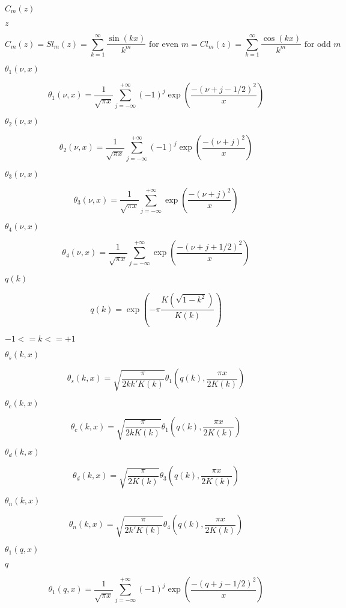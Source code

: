 \documentclass{article}
\begin{document}
$ C_m(z) $
\pagebreak

$ z $
\pagebreak

\[ C_m(z) = Sl_m(z) = \sum_{k=1}^\infty\frac{\sin(kx)}{k^m} \mbox{ for even } m = Cl_m(z) = \sum_{k=1}^\infty\frac{\cos(kx)}{k^m} \mbox{ for odd } m \]
\pagebreak

$ \theta_1(\nu,x) $
\pagebreak

\[ \theta_1(\nu,x) = \frac{1}{\sqrt{\pi x}} \sum_{j=-\infty}^{+\infty} (-1)^j \exp\left( \frac{-(\nu + j - 1/2)^2}{x} \right) \]
\pagebreak

$ \theta_2(\nu,x) $
\pagebreak

\[ \theta_2(\nu,x) = \frac{1}{\sqrt{\pi x}} \sum_{j=-\infty}^{+\infty} (-1)^j \exp\left( \frac{-(\nu + j)^2}{x} \right) \]
\pagebreak

$ \theta_3(\nu,x) $
\pagebreak

\[ \theta_3(\nu,x) = \frac{1}{\sqrt{\pi x}} \sum_{j=-\infty}^{+\infty} \exp\left( \frac{-(\nu+j)^2}{x} \right) \]
\pagebreak

$ \theta_4(\nu,x) $
\pagebreak

\[ \theta_4(\nu,x) = \frac{1}{\sqrt{\pi x}} \sum_{j=-\infty}^{+\infty} \exp\left( \frac{-(\nu + j + 1/2)^2}{x} \right) \]
\pagebreak

$ q(k) $
\pagebreak

\[ q(k) = \exp \left(-\pi\frac{K(\sqrt{1-k^2})}{K(k)} \right) \]
\pagebreak

$ -1 <= k <= +1 $
\pagebreak

$ \theta_s(k,x) $
\pagebreak

\[ \theta_s(k,x) = \sqrt{\frac{\pi}{2 k k' K(k)}} \theta_1\left(q(k),\frac{\pi x}{2K(k)}\right) \]
\pagebreak

$ \theta_c(k,x) $
\pagebreak

\[ \theta_c(k,x) = \sqrt{\frac{\pi}{2 k K(k)}} \theta_1\left(q(k),\frac{\pi x}{2K(k)}\right) \]
\pagebreak

$ \theta_d(k,x) $
\pagebreak

\[ \theta_d(k,x) = \sqrt{\frac{\pi}{2K(k)}} \theta_3\left(q(k),\frac{\pi x}{2K(k)}\right) \]
\pagebreak

$ \theta_n(k,x) $
\pagebreak

\[ \theta_n(k,x) = \sqrt{\frac{\pi}{2k'K(k)}} \theta_4\left(q(k),\frac{\pi x}{2K(k)}\right) \]
\pagebreak

$ \theta_1(q,x) $
\pagebreak

$ q $
\pagebreak

\[ \theta_1(q,x) = \frac{1}{\sqrt{\pi x}} \sum_{j=-\infty}^{+\infty} (-1)^j \exp\left( \frac{-(q + j - 1/2)^2}{x} \right) \]
\pagebreak
\end{document}

